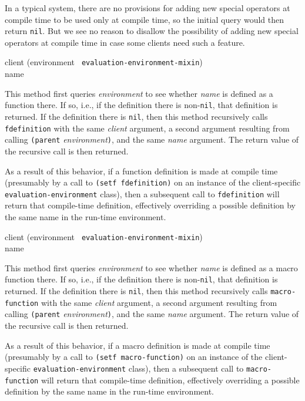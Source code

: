 In a typical system, there are no provisions for adding new special
operators at compile time to be used only at compile time, so the
initial query would then return \texttt{nil}.  But we see no reason to
disallow the possibility of adding new special operators at compile
time in case some clients need such a feature.

{\small{} {client (environment {\tt
      evaluation-environment-mixin}) \\ name}
}

This method first queries \textit{environment} to see whether
\textit{name} is defined as a function there.  If so, i.e., if the
definition there is non-\texttt{nil}, that definition is returned.  If
the definition there is \texttt{nil}, then this method recursively
calls \texttt{fdefinition} with the same \textit{client} argument, a
second argument resulting from calling \texttt{(parent}
\textit{environment}\texttt{)}, and the same \textit{name} argument.
The return value of the recursive call is then returned.

As a result of this behavior, if a function definition is made at
compile time (presumably by a call to \texttt{(setf fdefinition)} on
an instance of the client-specific \texttt{evaluation-environment}
class), then a subsequent call to \texttt{fdefinition} will return
that compile-time definition, effectively overriding a possible
definition by the same name in the run-time environment.

{\small{} {client (environment {\tt
      evaluation-environment-mixin}) \\ name}
}

This method first queries \textit{environment} to see whether
\textit{name} is defined as a macro function there.  If so, i.e., if
the definition there is non-\texttt{nil}, that definition is returned.
If the definition there is \texttt{nil}, then this method recursively
calls \texttt{macro-function} with the same \textit{client} argument,
a second argument resulting from calling \texttt{(parent}
\textit{environment}\texttt{)}, and the same \textit{name} argument.
The return value of the recursive call is then returned.

As a result of this behavior, if a macro definition is made at compile
time (presumably by a call to \texttt{(setf macro-function)} on an
instance of the client-specific \texttt{evaluation-environment}
class), then a subsequent call to \texttt{macro-function} will return
that compile-time definition, effectively overriding a possible
definition by the same name in the run-time environment.


